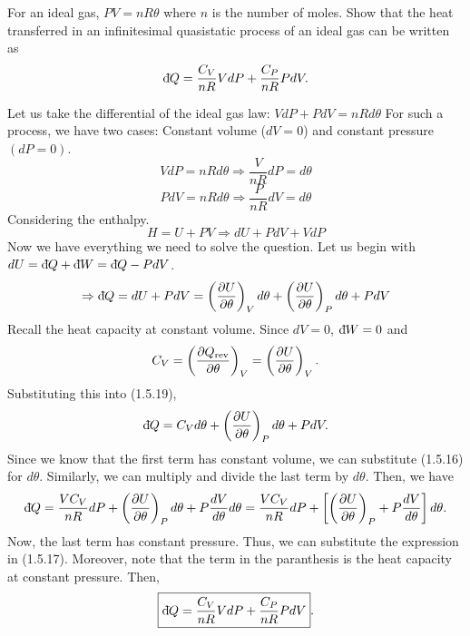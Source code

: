         \begin{eocproblem*}{1.6}
            For an ideal gas, $PV=nR\theta$ where $n$ is the number of moles. Show that the heat transferred in an infinitesimal quasistatic process of an ideal gas can be written as
            \begin{equation}
                \text{d}\hspace*{-0.13em}\bar{}\hspace*{0.1em} Q = \frac{C_V}{nR}VdP+\frac{C_P}{nR}PdV.
            \end{equation}
        \end{eocproblem*}
        Let us take the differential of the ideal gas law: $VdP + PdV = nRd\theta$
        For such a process, we have two cases: Constant volume ($dV=0$) and constant pressure $(dP=0)$.
            \begin{equation}
                VdP = nRd\theta \Rightarrow \frac{V}{nR}dP = d\theta
            \end{equation}
            \begin{equation}
                PdV = nRd\theta \Rightarrow \frac{P}{nR}dV = d\theta
            \end{equation}
        Considering the enthalpy.
        \begin{equation}
            H = U + PV \Rightarrow dU + PdV + VdP
        \end{equation}
        Now we have everything we need to solve the question. Let us begin with $dU = \text{d}\hspace*{-0.13em}\bar{}\hspace*{0.1em} Q + \text{d}\hspace*{-0.13em}\bar{}\hspace*{0.1em} W = \text{d}\hspace*{-0.13em}\bar{}\hspace*{0.1em} Q - PdV $.
        \begin{equation}
            \Rightarrow \text{d}\hspace*{-0.13em}\bar{}\hspace*{0.1em} Q = dU + PdV = \left( \frac{\partial U}{\partial \theta} \right)_Vd\theta + \left( \frac{\partial U}{\partial \theta} \right)_Pd\theta + PdV
        \end{equation}
        Recall the heat capacity at constant volume. Since $dV=0$, $\text{d}\hspace*{-0.13em}\bar{}\hspace*{0.1em} W=0$ and
        \begin{equation}
            C_V = \left( \frac{\partial Q_\text{rev}}{\partial \theta} \right)_V = \left( \frac{\partial U}{\partial \theta} \right)_V.
        \end{equation}
        Substituting this into (1.5.19),
        \begin{equation}
            \text{d}\hspace*{-0.13em}\bar{}\hspace*{0.1em} Q = C_Vd\theta + \left( \frac{\partial U}{\partial \theta} \right)_Pd\theta + PdV.
        \end{equation}
        Since we know that the first term has constant volume, we can substitute (1.5.16) for $d\theta$. Similarly, we can multiply and divide the last term by $d\theta$. Then, we have
        \begin{equation}
            \text{d}\hspace*{-0.13em}\bar{}\hspace*{0.1em} Q = \frac{VC_V}{nR}dP + \left( \frac{\partial U}{\partial \theta} \right)_Pd\theta + P\frac{d V}{d \theta}d\theta = \frac{VC_V}{nR}dP + \left[ \left( \frac{\partial U}{\partial \theta} \right)_P + P\frac{d V}{d \theta} \right]d\theta.
        \end{equation}
        Now, the last term has constant pressure. Thus, we can substitute the expression in (1.5.17). Moreover, note that the term in the paranthesis is the heat capacity at constant pressure. Then, 
        \begin{equation}
            \boxed{\text{d}\hspace*{-0.13em}\bar{}\hspace*{0.1em} Q = \frac{C_V}{nR}VdP + \frac{C_P}{nR}PdV}.
        \end{equation}

